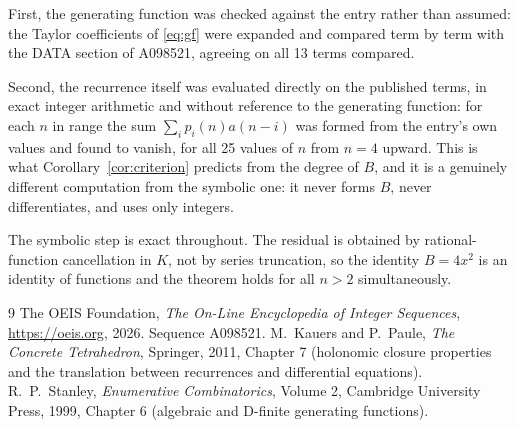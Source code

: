 \documentclass[11pt,a4paper]{article}
\theoremstyle{plain}
\theoremstyle{definition}
\begin{document}
First, the generating function was checked against the entry rather than assumed: the
Taylor coefficients of \eqref{eq:gf} were expanded and compared term by term with the DATA
section of A098521, agreeing on all 13 terms compared.

Second, the recurrence itself was evaluated directly on the published terms, in exact
integer arithmetic and without reference to the generating function: for each $n$ in range
the sum $\sum_{i}p_{i}(n)a(n-i)$ was formed from the entry's own values and found to
vanish, for all 25 values of $n$ from $n=4$ upward. This is what
Corollary~\ref{cor:criterion} predicts from the degree of $B$, and it is a genuinely
different computation from the symbolic one: it never forms $B$, never differentiates, and
uses only integers.

The symbolic step is exact throughout. The residual is obtained by rational-function
cancellation in $K$, not by series truncation, so the identity $B=4 x^{2}$ is an
identity of functions and the theorem holds for all $n>2$ simultaneously.

\begin{thebibliography}{9}
 The OEIS Foundation, \emph{The On-Line Encyclopedia of Integer Sequences},
\url{https://oeis.org}, 2026. Sequence A098521.
 M.~Kauers and P.~Paule, \emph{The Concrete Tetrahedron}, Springer, 2011,
Chapter 7 (holonomic closure properties and the translation between recurrences and
differential equations).
 R.~P.~Stanley, \emph{Enumerative Combinatorics}, Volume 2, Cambridge
University Press, 1999, Chapter 6 (algebraic and D-finite generating functions).
\end{thebibliography}
\end{document}
